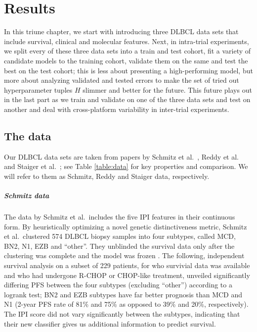 \chapter{Results} \label{chap:results}

In this triune chapter, we start with introducing three DLBCL data sets that include 
survival, clinical and molecular features. Next, in intra-trial experiments, we split every of these 
three data sets into 
a train and test cohort, fit a variety of candidate models to the training 
cohort, validate them on the same and test the best on the test cohort; this is less about presenting a 
high-performing model, but more about analyzing validated and tested errors to make the set of tried 
out hyperparameter tuples $H$ slimmer and 
better for the future. This future plays out in the last part as we train and validate on one of 
the three data sets and test on another and deal with cross-platform variability in inter-trial 
experiments.

\section{The data}\label{sec:data}

Our DLBCL data sets are taken from papers by Schmitz et al.\ \cite{schmitz18}, Reddy et al.\ 
\cite{reddy17} and Staiger et al.\ \cite{staiger20}; see Table \ref{table:data} for key properties 
and comparison. We will refer to them as Schmitz, Reddy and Staiger data, respectively.



\paragraph{Schmitz data}
The data by Schmitz et al.\ includes the five IPI features in their continuous form. 
By heuristically optimizing a novel genetic distinctiveness metric, Schmitz et al.\ 
clustered \num{574} DLBCL biopsy samples into four subtypes, called MCD, BN2, N1, EZB and ``other''. They 
unblinded the survival data only after the clustering was complete and the 
model was frozen \cite[Appendix 1, pp. 16--18]{schmitz18}. The following, independent survival analysis 
on a subset of \num{229} patients, for who survivial data was available and who had undergone R-CHOP 
or CHOP-like treatment, unveiled significantly differing PFS between the four subtypes (excluding 
``other'') according to a logrank test; BN2 and EZB subtypes have far better prognosis than MCD and 
N1 (2-year PFS rate of \num{81}\% and \num{75}\% as opposed to \num{39}\% and 
\num{20}\%, respectively). The IPI score did not vary significantly between the subtypes, 
indicating that their new classifier gives us additional information to predict survival.

